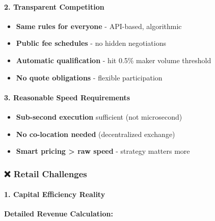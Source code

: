\hypertarget{transparent-competition}{%
\paragraph{\texorpdfstring{2. \textbf{Transparent
Competition}}{2. Transparent Competition}}\label{transparent-competition}}

\begin{itemize}
\tightlist
\item
  \textbf{Same rules for everyone} - API-based, algorithmic
\item
  \textbf{Public fee schedules} - no hidden negotiations
\item
  \textbf{Automatic qualification} - hit 0.5\% maker volume threshold
\item
  \textbf{No quote obligations} - flexible participation
\end{itemize}

\hypertarget{reasonable-speed-requirements}{%
\paragraph{\texorpdfstring{3. \textbf{Reasonable Speed
Requirements}}{3. Reasonable Speed Requirements}}\label{reasonable-speed-requirements}}

\begin{itemize}
\tightlist
\item
  \textbf{Sub-second execution} sufficient (not microsecond)
\item
  \textbf{No co-location needed} (decentralized exchange)
\item
  \textbf{Smart pricing \textgreater{} raw speed} - strategy matters
  more
\end{itemize}

\hypertarget{retail-challenges}{%
\subsubsection{\texorpdfstring{❌ \textbf{Retail
Challenges}}{❌ Retail Challenges}}\label{retail-challenges}}

\hypertarget{capital-efficiency-reality}{%
\paragraph{\texorpdfstring{1. \textbf{Capital Efficiency
Reality}}{1. Capital Efficiency Reality}}\label{capital-efficiency-reality}}

\textbf{Detailed Revenue Calculation:}

